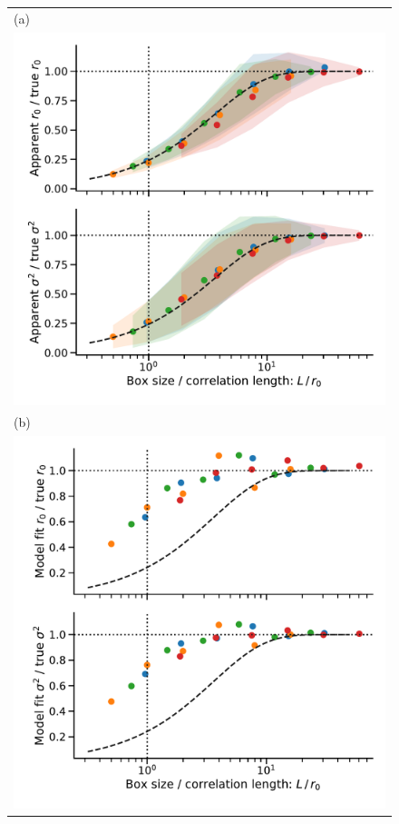 \documentclass[fleqn,usenatbib, useAMS, a4paper]{mnras}
\begin{document}
\begin{figure}
  \begin{tabular}{@{} l @{}}
    (a)\\
    \includegraphics[width=\linewidth]{Figures/fake-finite-box-effect}
    \\[\bigskipamount]
    (b)\\
    \includegraphics[width=\linewidth]{Figures/fake-finite-box-fits}

\end{tabular}
\end{figure}
\end{document}
